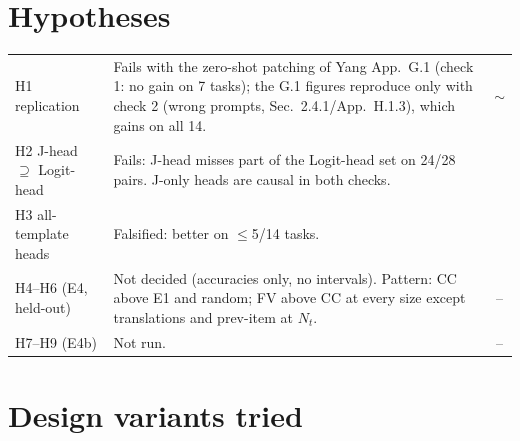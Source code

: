 \documentclass[10pt,a4paper]{article}
\newcommand{\no}{\textcolor{red!70!black}{\ding{55}}}
\newcommand{\mixed}{\textcolor{orange!80!black}{$\sim$}}
\begin{document}
\section{Hypotheses}

\begin{tabularx}{\textwidth}{@{}>{\raggedright\arraybackslash}p{3.6cm}Lc@{}}
\toprule
H1 replication & Fails with the zero-shot patching of Yang App.~G.1 (check 1: no gain on 7 tasks); the G.1 figures reproduce only with check 2 (wrong prompts, Sec.~2.4.1/App.~H.1.3), which gains on all 14. & \mixed \\
H2 J-head $\supseteq$ Logit-head & Fails: J-head misses part of the Logit-head set on 24/28 pairs. J-only heads are causal in both checks. & \no \\
H3 all-template heads & Falsified: better on $\leq$5/14 tasks. & \no \\
H4--H6 (E4, held-out) & Not decided (accuracies only, no intervals). Pattern: CC above E1 and random; FV above CC at every size except translations and prev-item at $N_t$. & -- \\
H7--H9 (E4b) & Not run. & -- \\
\bottomrule
\end{tabularx}

\section{Design variants tried}
\end{document}
